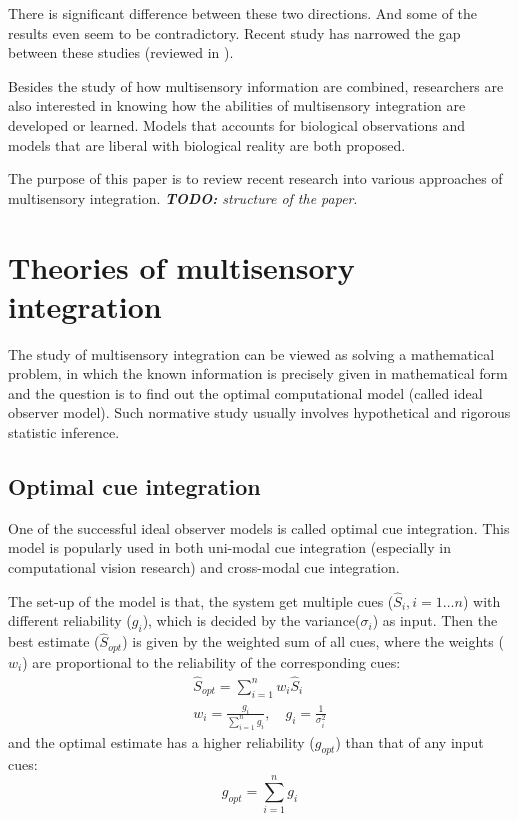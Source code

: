 \documentclass{article}[11pt]
\newcommand{\TODO}[1]{\emph{\small{{\bf TODO: } #1}}}
\begin{document}
There is significant difference between these two directions. And some of the results even seem to be contradictory. Recent study has narrowed the gap between these studies (reviewed in \cite{fetsch_bridging_2013}).

Besides the study of how multisensory information are combined, researchers are also interested in knowing how the abilities of multisensory integration are developed or learned. Models that accounts for biological observations and models that are liberal with biological reality are both proposed.

The purpose of this paper is to review recent research into various approaches of multisensory integration.
\TODO{structure of the paper}.

\section{Theories of multisensory integration}
The study of multisensory integration can be viewed as solving a mathematical problem, in which the known information is precisely given in mathematical form and the question is to find out the optimal computational model (called ideal observer model). Such normative study usually involves hypothetical and rigorous statistic inference.

\subsection{Optimal cue integration}
One of the successful ideal observer models is called optimal cue integration\cite{geisler_contributions_2011}. This model is popularly used in both uni-modal cue integration (especially in computational vision research) and cross-modal cue integration.

The set-up of the model is that, the system get multiple cues ($\hat{S}_i, i=1 \dots n$) with different reliability ($g_i$), which is decided by the variance($\sigma_i$) as input. Then the best estimate ($\hat{S}_{opt}$) is given by the weighted sum of all cues, where the weights ($w_i$) are proportional to the reliability of the corresponding cues:
\begin{gather}
  \hat{S}_{opt} = \sum_{i=1}^{n} w_i \hat{S}_i \label{eq:optest} \\
  w_i = \frac{g_i}{\sum_{i=1}^{n} g_i}, \quad g_i = \frac{1}{\sigma_i^2} \label{eq:optweight}
\end{gather}
and the optimal estimate has a higher reliability ($g_{opt}$) than that of any input cues:
\begin{equation}
  g_{opt} = \sum_{i=1}^{n} g_i \label{eq:optrel}
\end{equation}
\end{document}
